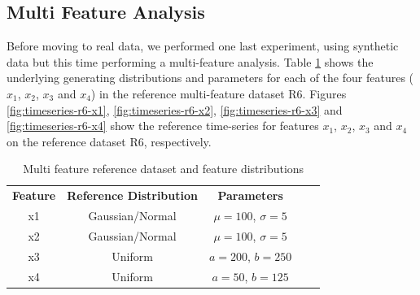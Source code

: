 \subsection{Multi Feature Analysis}
Before moving to real data, we performed one last experiment, using synthetic data but this time performing a multi-feature analysis. Table \ref{tbl:multi-feat-ref-dataset-distros} shows the underlying generating distributions and parameters for each of the four features ($x_1$, $x_2$, $x_3$ and $x_4$) in the reference multi-feature dataset R6. Figures \ref{fig:timeseries-r6-x1}, \ref{fig:timeseries-r6-x2}, \ref{fig:timeseries-r6-x3} and \ref{fig:timeseries-r6-x4} show the reference time-series for features $x_1$, $x_2$, $x_3$ and $x_4$ on the reference dataset R6, respectively.

\begin{table}[!htb]
    \begin{center}
        \begin{tabular}{|c|c|c|ll}
        \cline{1-3}
        \textbf{Feature} & \textbf{Reference Distribution} & \textbf{Parameters} &  &  \\ \cline{1-3}
        x1               & Gaussian/Normal                 & $\mu=100$, $\sigma=5$  &  &  \\ \cline{1-3}
        x2               & Gaussian/Normal                 & $\mu=100$, $\sigma=5$  &  &  \\ \cline{1-3}
        x3               & Uniform                         & $a=200$, $b=250$       &  &  \\ \cline{1-3}
        x4               & Uniform                         & $a=50$, $b=125$        &  &  \\ \cline{1-3}
        \end{tabular}
    \end{center}
    \caption{Multi feature reference dataset and feature distributions}
    \label{tbl:multi-feat-ref-dataset-distros}
\end{table}


